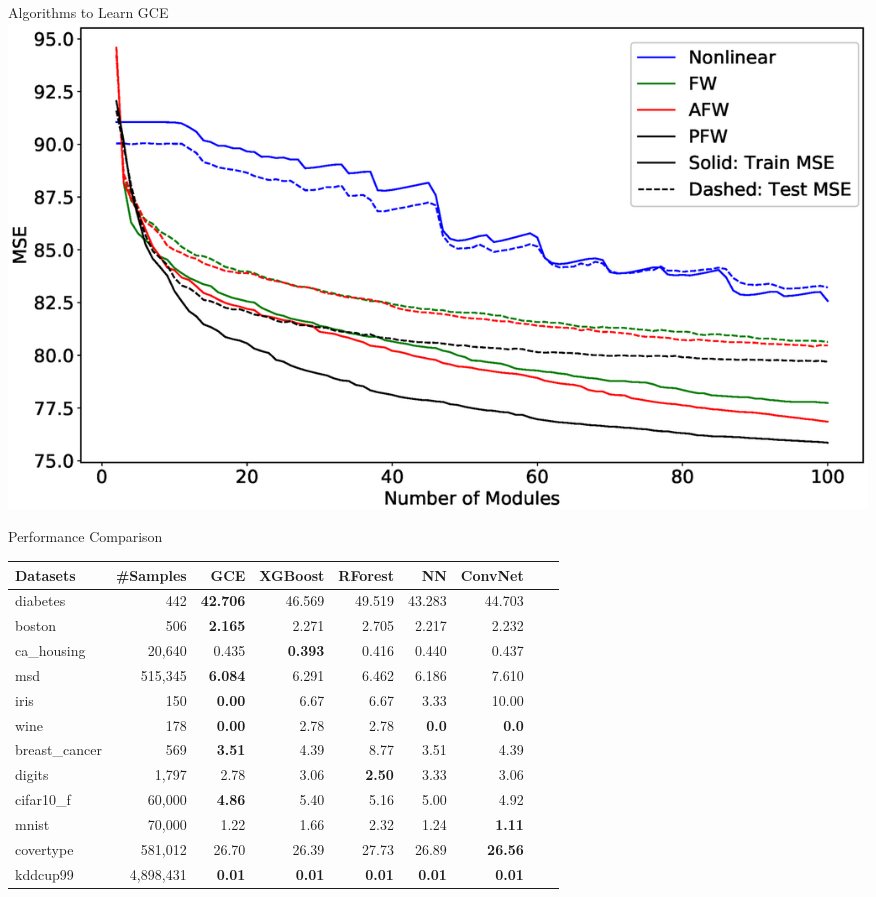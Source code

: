 \documentclass[11pt, xcolor={dvipsnames}]{beamer}
\begin{document}
\begin{frame}{Algorithms to Learn GCE}
\includegraphics[width=\columnwidth]{nips_greedy_algs_msd.eps}
\end{frame}

\begin{frame}{Performance Comparison}
\footnotesize{
\begin{table}[H]
\centering
\begin{tabular}[t]{lrrrrrrrr} 
\toprule
\textbf{Datasets} & \#\textbf{Samples} & \textbf{GCE} & \textbf{XGBoost} & \textbf{RForest} & \textbf{NN} & \textbf{ConvNet} \\
\midrule
diabetes & 442 & \textbf{42.706} & 46.569 & 49.519 & 43.283 & 44.703 \\
boston & 506 & \textbf{2.165} & 2.271 & 2.705 & 2.217 & 2.232 \\
ca\_housing &20,640& 0.435 & \textbf{0.393} & 0.416 & 0.440 & 0.437  \\
msd & 515,345& \textbf{6.084} & 6.291 & 6.462 & 6.186 & 7.610 \\
\midrule
iris & 150 & \textbf{0.00} & 6.67 & 6.67 & 3.33 & 10.00  \\
wine & 178 & \textbf{0.00} & 2.78 & 2.78 & \textbf{0.0} & \textbf{0.0}  \\
breast\_cancer & 569 & \textbf{3.51} & 4.39 & 8.77 & 3.51 & 4.39 \\
digits & 1,797 & 2.78 & 3.06 & \textbf{2.50} & 3.33 & 3.06 \\
cifar10\_f & 60,000 & \textbf{4.86} & 5.40 & 5.16 & 5.00 & 4.92 \\
mnist & 70,000 & 1.22 & 1.66 & 2.32 & 1.24 & \textbf{1.11} \\
covertype & 581,012 & 26.70 & 26.39 & 27.73 & 26.89 & \textbf{26.56} \\
kddcup99 & 4,898,431 & \textbf{0.01} & \textbf{0.01} & \textbf{0.01} & \textbf{0.01} & \textbf{0.01}\\
\bottomrule
\end{tabular}
\end{table}
}
\end{frame}
\end{document}
